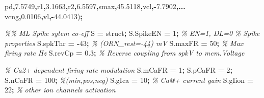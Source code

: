 \documentclass[
]{article}
\newenvironment{Shaded}{\begin{snugshade}}{\end{snugshade}}
\newcommand{\CommentTok}[1]{\textcolor[rgb]{0.56,0.35,0.01}{\textit{#1}}}
\newcommand{\FloatTok}[1]{\textcolor[rgb]{0.00,0.00,0.81}{#1}}
\newcommand{\FunctionTok}[1]{\textcolor[rgb]{0.00,0.00,0.00}{#1}}
\newcommand{\NormalTok}[1]{#1}
\newcommand{\OperatorTok}[1]{\textcolor[rgb]{0.81,0.36,0.00}{\textbf{#1}}}
\newcommand{\StringTok}[1]{\textcolor[rgb]{0.31,0.60,0.02}{#1}}
\begin{document}
\begin{Shaded}
\begin{Highlighting}[]
        \StringTok{\textquotesingle{}pd\textquotesingle{}}\OperatorTok{,}\FloatTok{7.5749}\OperatorTok{,}\StringTok{\textquotesingle{}r1\textquotesingle{}}\OperatorTok{,}\FloatTok{3.1663}\OperatorTok{,}\StringTok{\textquotesingle{}r2\textquotesingle{}}\OperatorTok{,}\FloatTok{6.5597}\OperatorTok{,}\StringTok{\textquotesingle{}smax\textquotesingle{}}\OperatorTok{,}\FloatTok{45.5118}\OperatorTok{,}\StringTok{\textquotesingle{}vcl\textquotesingle{}}\OperatorTok{,{-}}\FloatTok{7.7902}\OperatorTok{,...}
        \StringTok{\textquotesingle{}vcng\textquotesingle{}}\OperatorTok{,}\FloatTok{0.0106}\OperatorTok{,}\StringTok{\textquotesingle{}vl\textquotesingle{}}\OperatorTok{,{-}}\FloatTok{44.0413}\NormalTok{)}\OperatorTok{;}

\CommentTok{\%\% ML Spike sytem co{-}eff}
\NormalTok{S }\OperatorTok{=} \FunctionTok{struct}\OperatorTok{;}
\NormalTok{S.SpikeEN }\OperatorTok{=} \FloatTok{1}\OperatorTok{;} \CommentTok{\% EN=1, DL=0}
\CommentTok{\% Spike properties}
\NormalTok{S.spkThr }\OperatorTok{=} \OperatorTok{{-}}\FloatTok{43}\OperatorTok{;} \CommentTok{\% (ORN\_rest={-}44) mV}
\NormalTok{S.maxFR }\OperatorTok{=} \FloatTok{50}\OperatorTok{;} \CommentTok{\% Max firing rate Hz}
\NormalTok{S.revCp }\OperatorTok{=} \FloatTok{0.3}\OperatorTok{;} \CommentTok{\% Reverse coupling from spkV to mem.Voltage}

\CommentTok{\% Ca2+ dependent firing rate modulation }
\NormalTok{S.mCaFR }\OperatorTok{=} \FloatTok{1}\OperatorTok{;}\NormalTok{ S.pCaFR }\OperatorTok{=} \FloatTok{2}\OperatorTok{;}\NormalTok{ S.nCaFR }\OperatorTok{=} \FloatTok{100}\OperatorTok{;} \CommentTok{\%(min,pos,neg)}
\NormalTok{S.gIca }\OperatorTok{=} \FloatTok{10}\OperatorTok{;} \CommentTok{\% Ca@+ current gain}
\NormalTok{S.gIion }\OperatorTok{=} \FloatTok{22}\OperatorTok{;} \CommentTok{\% other ion channels activation}


\end{Highlighting}
\end{Shaded}
\end{document}
